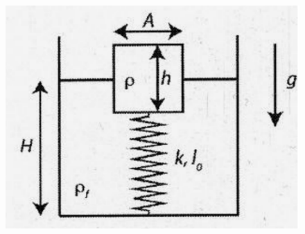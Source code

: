 \documentclass[letterpaper,11pt]{article}
\begin{document}
\begin{enumerate}
\begin{enumerate}
    \end{enumerate}
    \begin{figure}[H]
        \centering
        \includegraphics[height=0.3\textwidth]{2023-1/img/aux_16/Aux 16 - P4.PNG}
    \end{figure}





%   

\end{enumerate}
\end{document}
